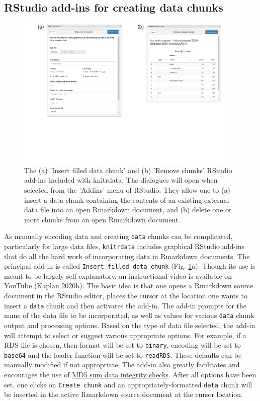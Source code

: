 \hypertarget{addins}{%
\subsection{RStudio add-ins for creating data chunks}\label{addins}}

\begin{figure}
\includegraphics[width=400px]{2020-knitrdata_files/figure-latex/addinfigure-1} \caption{The (a) 'Insert filled data chunk' and (b) 'Remove chunks' RStudio add-ins included with knitrdata. The dialogues will open when selected from the 'Addins' menu of RStudio. They allow one to (a) insert a data chunk containing the contents of an existing external data file into an open Rmarkdown document, and (b) delete one or more chunks from an open Rmarkdown document.}\label{fig:addinfigure}
\end{figure}

As manually encoding data and creating \texttt{data} chunks can be complicated, particularly for large data files, \texttt{knitrdata} includes graphical RStudio add-ins that do all the hard work of incorporating data in Rmarkdown documents. The principal add-in is called \texttt{Insert\ filled\ data\ chunk} (Fig. \ref{fig:addinfigure}a). Though its use is meant to be largely self-explanatory, an instructional video is available on YouTube (Kaplan 2020b). The basic idea is that one opens a Rmarkdown source document in the RStudio editor, places the cursor at the location one wants to insert a \texttt{data} chunk and then activates the add-in. The add-in prompts for the name of the data file to be incorporated, as well as values for various \texttt{data} chunk output and processing options. Based on the type of data file selected, the add-in will attempt to select or suggest various appropriate options. For example, if a RDS file is chosen, then format will be set to \texttt{binary}, encoding will be set to \texttt{base64} and the loader function will be set to \texttt{readRDS}. These defaults can be manually modified if not appropriate. The add-in also greatly facilitates and encourages the use of \protect\hyperlink{integrity}{MD5 sum data integrity checks}. After all options have been set, one clicks on \texttt{Create\ chunk} and an appropriately-formatted \texttt{data} chunk will be inserted in the active Rmarkdown source document at the cursor location.

